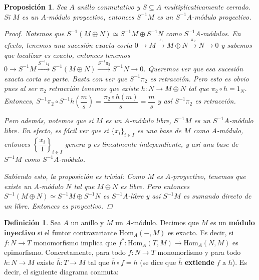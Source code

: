 \documentclass[12pt]{book}
\newtheorem{prop}[teo]{Proposición}
\theoremstyle{definition}
\newtheorem{defn}[teo]{Definición}
\renewcommand{\hom}{\mathrm{Hom}}
\begin{document}
\begin{prop}
Sea $A$ anillo conmutativo y $S\subseteq A$ multiplicativamente cerrado. Si $M$ es un $A$-módulo proyectivo, entonces $S^{-1}M$ es un $S^{-1}A$-módulo proyectivo.
\begin{proof}
Notemos que $S^{-1}(M\oplus N) \simeq S^{-1}M\oplus S^{-1}N$ como $S^{-1}A$-módulos. En efecto, tenemos una sucesión exacta corta $0\longrightarrow M\stackrel{\iota_1}{\longrightarrow}M\oplus N\stackrel{\pi_2}{\longrightarrow} N\longrightarrow 0$ y sabemos que localizar es exacto, entonces tenemos $0\longrightarrow S^{-1}M\stackrel{S^{-1}\iota_1}{\longrightarrow} S^{-1}(M\oplus N)\stackrel{S^{-1}\pi_2}{\longrightarrow} S^{-1}N\longrightarrow 0$. Queremos ver que esa sucesión exacta corta se parte. Basta con ver que $S^{-1}\pi_2$ es retracción. Pero esto es obvio pues al ser $\pi_2$ retracción tenemos que existe $h:N\to M\oplus N$ tal que $\pi_2\circ h = 1_N$. Entonces, $S^{-1}\pi_2 \circ S^{-1}h \left(\dfrac{m}{s}\right) = \dfrac{\pi_2\circ h(m)}{s} = \dfrac{m}{s}$ y así $S^{-1}\pi_2$ es retracción.

Pero además, notemos que si $M$ es un $A$-módulo libre, $S^{-1}M$ es un $S^{-1}A$-módulo libre. En efecto, es fácil ver que si $\{x_i\}_{i\in I}$ es una base de $M$ como $A$-módulo, entonces $\left\{\dfrac{x_i}{1}\right\}_{i\in I}$ genera y es linealmente independiente, y así una base de $S^{-1}M$ como $S^{-1}A$-módulo.

Sabiendo esto, la proposición es trivial: Como $M$ es $A$-proyectivo, tenemos que existe un $A$-módulo $N$ tal que $M\oplus N$ es libre. Pero entonces $S^{-1}(M\oplus N)\simeq S^{-1}M\oplus S^{-1}N$ es $S^{-1}A$-libre y así $S^{-1}M$ es sumando directo de un libre. Entonces es proyectivo.
\end{proof}
\end{prop}

\begin{defn}
Sea $A$ un anillo y $M$ un $A$-módulo. Decimos que $M$ es un \textbf{módulo inyectivo} si el funtor contravariante $\hom_A(-,M)$ es exacto. Es decir, si $f:N\to T$ monomorfismo implica que $f^*:\hom_A(T,M)\to\hom_A(N,M)$ es epimorfismo. Concretamente, para todo $f:N\to T$ monomorfismo y para todo $h:N\to M$ existe $\overline{h}:T\to M$ tal que $\overline{h}\circ f=h$ (se dice que $\overline{h}$ \textbf{extiende} $f$ a $h$). Es decir, el siguiente diagrama conmuta:

\end{defn}
\end{document}
